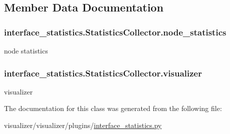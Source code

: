\subsection{Member Data Documentation}
\subsubsection[{\texorpdfstring{node\+\_\+statistics}{node_statistics}}]{\setlength{\rightskip}{0pt plus 5cm}interface\+\_\+statistics.\+Statistics\+Collector.\+node\+\_\+statistics}\hypertarget{classinterface__statistics_1_1StatisticsCollector_a0e9aacae75826dc6cc57b063d71bc3d1}{}\label{classinterface__statistics_1_1StatisticsCollector_a0e9aacae75826dc6cc57b063d71bc3d1}


node statistics 

\subsubsection[{\texorpdfstring{visualizer}{visualizer}}]{\setlength{\rightskip}{0pt plus 5cm}interface\+\_\+statistics.\+Statistics\+Collector.\+visualizer}\hypertarget{classinterface__statistics_1_1StatisticsCollector_af7c6f75e1186b946219df43583461f2d}{}\label{classinterface__statistics_1_1StatisticsCollector_af7c6f75e1186b946219df43583461f2d}


visualizer 



The documentation for this class was generated from the following file\+:\begin{DoxyCompactItemize}
\item 
visualizer/visualizer/plugins/\hyperlink{interface__statistics_8py}{interface\+\_\+statistics.\+py}\end{DoxyCompactItemize}
